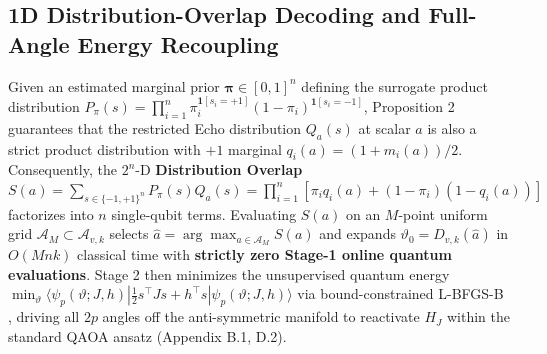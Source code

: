 \documentclass{article}
\theoremstyle{plain}
\theoremstyle{definition}
\begin{document}
\subsection{1D Distribution-Overlap Decoding and Full-Angle Energy Recoupling}\label{subsec:4_2}

Given an estimated marginal prior $\boldsymbol{\pi}\in[0,1]^n$ defining the surrogate product distribution $P_{\pi}(s)=\prod_{i=1}^n\pi_i^{\mathbf1[s_i=+1]}(1-\pi_i)^{\mathbf1[s_i=-1]}$, Proposition 2 guarantees that the restricted Echo distribution $Q_a(s)$ at scalar $a$ is also a strict product distribution with $+1$ marginal $q_i(a)=(1+m_i(a))/2$. Consequently, the $2^n$-D \textbf{Distribution Overlap} $S(a)=\sum_{s\in\{-1,+1\}^n}P_{\pi}(s)Q_a(s)=\prod_{i=1}^n[\pi_iq_i(a)+(1-\pi_i)(1-q_i(a))]$ factorizes into $n$ single-qubit terms. Evaluating $S(a)$ on an $M$-point uniform grid $\mathcal A_M\subset\mathcal A_{v,k}$ selects $\widehat a=\arg\max_{a\in\mathcal A_M}S(a)$ and expands $\vartheta_0=D_{v,k}(\widehat a)$ in $O(Mnk)$ classical time with \textbf{strictly zero Stage-1 online quantum evaluations}. Stage 2 then minimizes the unsupervised quantum energy $\min_{\vartheta}\langle\psi_p(\vartheta;J,h)|\frac12s^\top Js+h^\top s|\psi_p(\vartheta;J,h)\rangle$ via bound-constrained L-BFGS-B \citep{byrd1995limited}, driving all $2p$ angles off the anti-symmetric manifold to reactivate $H_J$ within the standard QAOA ansatz (Appendix B.1, D.2).
\end{document}
